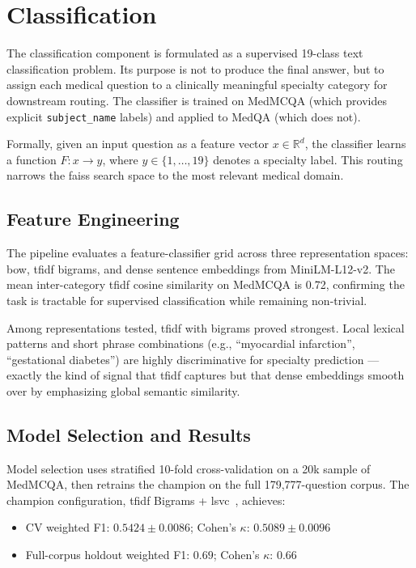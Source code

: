 \section{Classification}
\label{sec:classification}

The classification component is formulated as a supervised 19-class text classification problem. Its purpose is not to produce the final answer, but to assign each medical question to a clinically meaningful specialty category for downstream routing. The classifier is trained on MedMCQA (which provides explicit \texttt{subject\_name} labels) and applied to MedQA (which does not).

Formally, given an input question as a feature vector $x \in \mathbb{R}^d$, the classifier learns a function $F: x \rightarrow y$, where $y \in \{1,\ldots,19\}$ denotes a specialty label. This routing narrows the \gls{faiss} search space to the most relevant medical domain.

\subsection{Feature Engineering}

The pipeline evaluates a feature-classifier grid across three representation spaces: \gls{bow}, \gls{tfidf} bigrams, and dense sentence embeddings from MiniLM-L12-v2. The mean inter-category \gls{tfidf} cosine similarity on MedMCQA is 0.72, confirming the task is tractable for supervised classification while remaining non-trivial.

Among representations tested, \gls{tfidf} with bigrams proved strongest. Local lexical patterns and short phrase combinations (e.g., ``myocardial infarction'', ``gestational diabetes'') are highly discriminative for specialty prediction --- exactly the kind of signal that \gls{tfidf} captures but that dense embeddings smooth over by emphasizing global semantic similarity.

\subsection{Model Selection and Results}

Model selection uses stratified 10-fold cross-validation on a 20k sample of MedMCQA, then retrains the champion on the full 179,777-question corpus. The champion configuration, \gls{tfidf} Bigrams + \gls{lsvc}~\cite{fan2008}, achieves:

\begin{itemize}
  \item CV weighted F1: $0.5424 \pm 0.0086$; Cohen's $\kappa$: $0.5089 \pm 0.0096$
  \item Full-corpus holdout weighted F1: $0.69$; Cohen's $\kappa$: $0.66$
\end{itemize}

